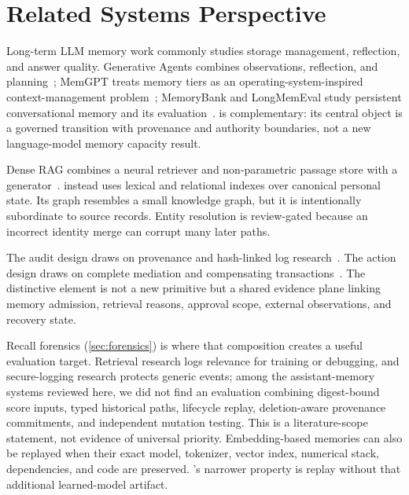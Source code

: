 \section{Related Systems Perspective}
\label{sec:related}

Long-term LLM memory work commonly studies storage management, reflection, and answer quality. Generative Agents combines observations, reflection, and planning~\cite{park2023generative}; MemGPT treats memory tiers as an operating-system-inspired context-management problem~\cite{packer2023memgpt}; MemoryBank and LongMemEval study persistent conversational memory and its evaluation~\cite{zhong2023memorybank,wu2024longmemeval}. \system{} is complementary: its central object is a governed transition with provenance and authority boundaries, not a new language-model memory capacity result.

Dense RAG combines a neural retriever and non-parametric passage store with a generator~\cite{lewis2020rag}. \system{} instead uses lexical and relational indexes over canonical personal state. Its graph resembles a small knowledge graph, but it is intentionally subordinate to source records. Entity resolution is review-gated because an incorrect identity merge can corrupt many later paths.

The audit design draws on provenance and hash-linked log research~\cite{buneman2001provenance,haber1991timestamp,schneier1998securelogs}. The action design draws on complete mediation and compensating transactions~\cite{saltzer1975protection,garciamolina1987sagas}. The distinctive element is not a new primitive but a shared evidence plane linking memory admission, retrieval reasons, approval scope, external observations, and recovery state.

Recall forensics (\cref{sec:forensics}) is where that composition creates a useful evaluation target. Retrieval research logs relevance for training or debugging, and secure-logging research protects generic events; among the assistant-memory systems reviewed here, we did not find an evaluation combining digest-bound score inputs, typed historical paths, lifecycle replay, deletion-aware provenance commitments, and independent mutation testing. This is a literature-scope statement, not evidence of universal priority. Embedding-based memories can also be replayed when their exact model, tokenizer, vector index, numerical stack, dependencies, and code are preserved. \system{}'s narrower property is replay without that additional learned-model artifact.

